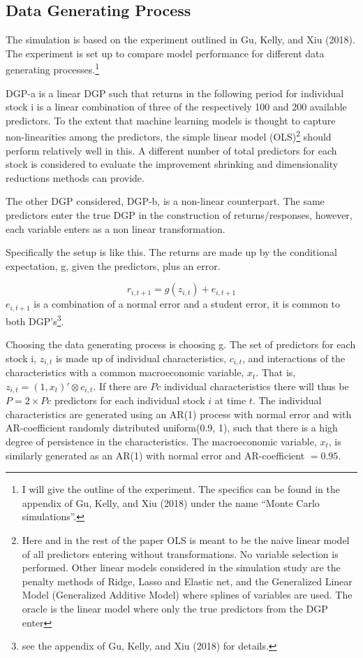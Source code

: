 \documentclass[11pt]{article}
\let\rmarkdownfootnote\footnote%
\def\footnote{\protect\rmarkdownfootnote}
\begin{document}
\hypertarget{data-generating-process}{%
\subsection{Data Generating Process}\label{data-generating-process}}

The simulation is based on the experiment outlined in Gu, Kelly, and Xiu
(2018). The experiment is set up to compare model performance for
different data generating processes.\footnote{I will give the outline of
  the experiment. The specifics can be found in the appendix of Gu,
  Kelly, and Xiu (2018) under the name ``Monte Carlo simulations''.}

DGP-a is a linear DGP such that returns in the following period for
individual stock i is a linear combination of three of the respectively
100 and 200 available predictors. To the extent that machine learning
models is thought to capture non-linearities among the predictors, the
simple linear model (OLS)\footnote{Here and in the rest of the paper OLS
  is meant to be the naive linear model of all predictors entering
  without transformations. No variable selection is performed. Other
  linear models considered in the simulation study are the penalty
  methods of Ridge, Lasso and Elastic net, and the Generalized Linear
  Model (Generalized Additive Model) where splines of variables are
  used. The oracle is the linear model where only the true predictors
  from the DGP enter} should perform relatively well in this. A
different number of total predictors for each stock is considered to
evaluate the improvement shrinking and dimensionality reductions methods
can provide.

The other DGP considered, DGP-b, is a non-linear counterpart. The same
predictors enter the true DGP in the construction of returns/responses,
however, each variable enters as a non linear transformation.

Specifically the setup is like this. The returns are made up by the
conditional expectation, g, given the predictors, plus an error.

\[r_{i,t+1}= g(z_{i,t}) + e_{i, t+1}\] \(e_{i, t+1}\) is a combination
of a normal error and a student error, it is common to both
DGP's\footnote{see the appendix of Gu, Kelly, and Xiu (2018) for details.}.

Choosing the data generating process is choosing g. The set of
predictors for each stock i, \(z_{i,t}\) is made up of individual
characteristics, \(c_{i,t}\), and interactions of the characteristics
with a common macroeconomic variable, \(x_t\). That is,
\(z_{i,t} = (1, x_t)' \otimes c_{i,t}\). If there are \(Pc\) individual
characteristics there will thus be \(P = 2 \times Pc\) predictors for
each individual stock \(i\) at time \(t\). The individual
characteristics are generated using an AR(1) process with normal error
and with AR-coefficient randomly distributed uniform(0.9, 1), such that
there is a high degree of persistence in the characteristics. The
macroeconomic variable, \(x_t\), is similarly generated as an AR(1) with
normal error and AR-coefficient \( = 0.95\).
\end{document}
